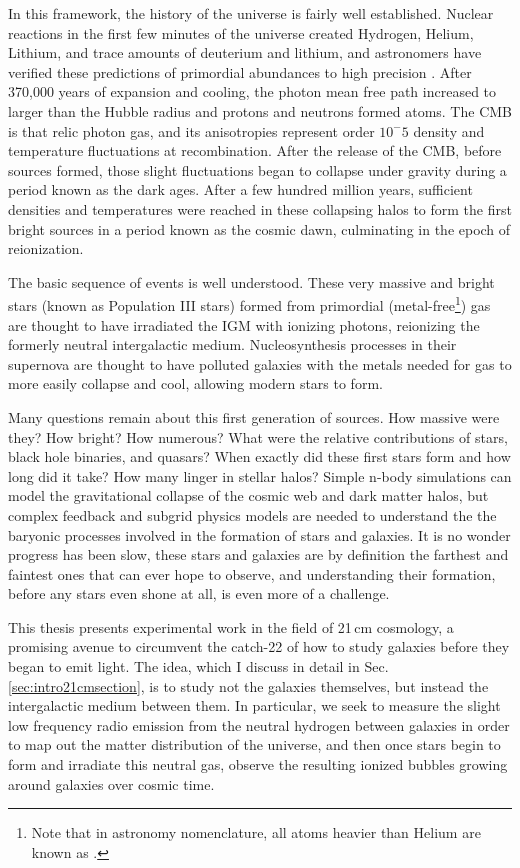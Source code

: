 In this framework, the history of the universe is fairly well established. Nuclear reactions in the first few minutes of the universe created Hydrogen, Helium, Lithium, and trace amounts of deuterium and lithium, and astronomers have verified these predictions of primordial abundances to high precision \citep{bbn}. After 370,000 years of expansion and cooling, the photon mean free path increased to larger than the Hubble radius and protons and neutrons formed atoms. The CMB is that relic photon gas, and its anisotropies represent order $10^-5$ density and temperature fluctuations at recombination. After the release of the CMB, before sources formed, those slight fluctuations began to collapse under gravity during a period known as the dark ages. After a few hundred million years, sufficient densities and temperatures were reached in these collapsing halos to form the first bright sources in a period known as the cosmic dawn, culminating in the epoch of reionization. 

The basic sequence of events is well understood. These very massive and bright stars (known as Population III stars) formed from primordial (metal-free\footnote{Note that in astronomy nomenclature, all atoms heavier than Helium are known as .}) gas are thought to have irradiated the IGM with ionizing photons, reionizing the formerly neutral intergalactic medium. Nucleosynthesis processes in their supernova are thought to have polluted galaxies with the metals needed for gas to more easily collapse and cool, allowing modern stars to form. 

Many questions remain about this first generation of sources. How massive were they? How bright? How numerous? What were the relative contributions of stars, black hole binaries, and quasars? When exactly did these first stars form and how long did it take? How many linger in stellar halos? Simple n-body simulations can model the gravitational collapse of the cosmic web and dark matter halos, but complex feedback and subgrid physics models are needed to understand the the baryonic processes involved in the formation of stars and galaxies. It is no wonder progress has been slow, these stars and galaxies are by definition the farthest and faintest ones that can ever hope to observe, and understanding their formation, before any stars even shone at all, is even more of a challenge. 

This thesis presents experimental work in the field of 21\,cm cosmology, a promising avenue to circumvent the catch-22 of how to study galaxies before they began to emit light. The idea, which I discuss in detail in Sec. \ref{sec:intro21cmsection}, is to study not the galaxies themselves, but instead the intergalactic medium between them. In particular, we seek to measure the slight low frequency radio emission from the neutral hydrogen between galaxies in order to map out the matter distribution of the universe, and then once stars begin to form and irradiate this neutral gas, observe the resulting ionized bubbles growing around galaxies over cosmic time. 

